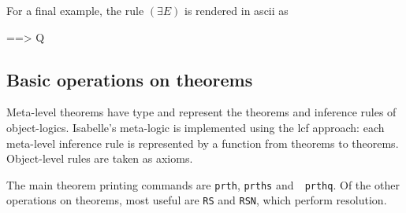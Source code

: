 For a final example, the rule $(\exists E)$ is rendered in {\sc ascii} as
\begin{ttbox}
[| EX x.P(x);  !!x. P(x) ==> Q |] ==> Q
\end{ttbox}


\subsection{Basic operations on theorems}
Meta-level theorems have type  and represent the theorems and
inference rules of object-logics.  Isabelle's meta-logic is implemented
using the {\sc lcf} approach: each meta-level inference rule is represented by
a function from theorems to theorems.  Object-level rules are taken as
axioms.

The main theorem printing commands are {\tt prth}, {\tt prths} and~{\tt
  prthq}.  Of the other operations on theorems, most useful are {\tt RS}
and {\tt RSN}, which perform resolution.

